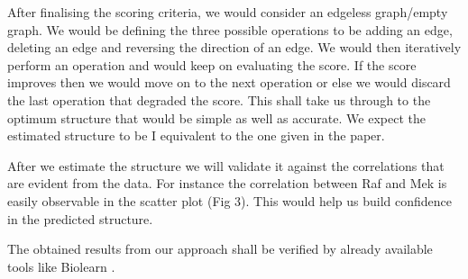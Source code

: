 \documentclass[conference]{IEEEtran}
\begin{document}
After finalising the scoring criteria, we would consider an edgeless graph/empty graph. We would be defining the three possible operations to be adding an edge, deleting an edge and reversing the direction of an edge. We would then iteratively perform an operation and would keep on evaluating the score. If the score improves then we would move on to the next operation or else we would discard the last operation that degraded the score. This shall take us through to the optimum structure that would be simple as well as accurate. We expect the estimated structure to be I equivalent to the one given in the paper.\par
After we estimate the structure we will validate it against the correlations that are evident from the data. For instance the correlation between Raf and Mek is easily observable in the scatter plot (Fig 3). This would help us build confidence in the predicted structure.
\par
The obtained results from our approach shall be verified by already available tools like Biolearn \cite{pe2005bayesian}.

\noindent\makebox[\linewidth]{\rule{\linewidth}{0.4pt}}
\medskip


\end{document}

